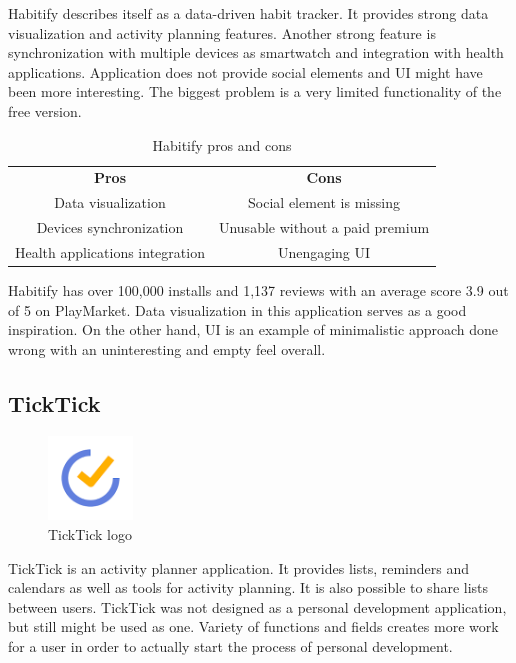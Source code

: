 Habitify describes itself as a data-driven habit tracker.
It provides strong data visualization and activity planning features.
Another strong feature is synchronization with multiple devices as smartwatch and integration with health applications.
Application does not provide social elements and UI might have been more interesting.
The biggest problem is a very limited functionality of the free version.

\begin{table}[h!]
    \centering
    \begin{ctucolortab}
        \begin{tabular}{cc}
            \bfseries Pros & \bfseries Cons\\\Midrule
            Data visualization & Social element is missing\\
            Devices synchronization & Unusable without a paid premium\\
            Health applications integration & Unengaging UI \\
        \end{tabular}
    \end{ctucolortab}
    \caption{Habitify pros and cons}\label{tab:habitify-pros-cons}
\end{table}

Habitify has over 100,000 installs and 1,137 reviews with an average score 3.9 out of 5 on PlayMarket.
Data visualization in this application serves as a good inspiration.
On the other hand, UI is an example of minimalistic approach done wrong with an uninteresting and empty feel overall.


\subsection{TickTick}\label{subsec:ticktick}

\begin{figure}[h!]
    \includegraphics[width=0.20\textwidth]{images/ticktick-logo.png}
    \caption{TickTick logo~\cite{ticktick-logo}}
    \label{fig:ticktick-logo}
\end{figure}

TickTick is an activity planner application.
It provides lists, reminders and calendars as well as tools for activity planning.
It is also possible to share lists between users.
TickTick was not designed as a personal development application, but still might be used as one.
Variety of functions and fields creates more work for a user in order to actually start the process of personal development.

